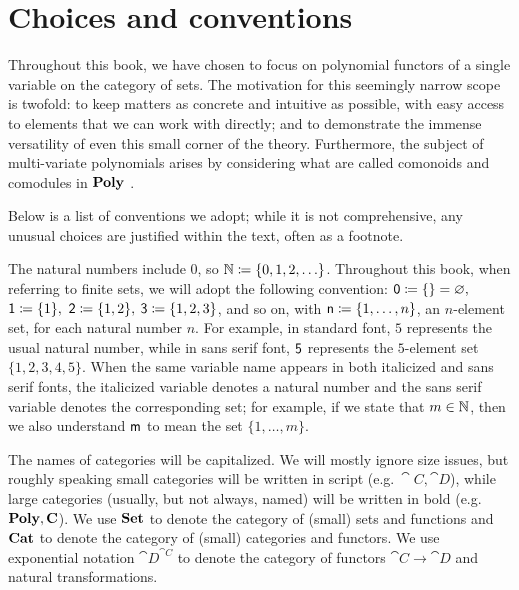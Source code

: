 \documentclass[Book-Poly]{subfiles}
\begin{document}
\section{Choices and conventions}\label{sec.choices}

Throughout this book, we have chosen to focus on polynomial functors of a single variable on the category of sets.
The motivation for this seemingly narrow scope is twofold: to keep matters as concrete and intuitive as possible, with easy access to elements that we can work with directly; and to demonstrate the immense versatility of even this small corner of the theory. Furthermore, the subject of multi-variate polynomials arises by considering what are called comonoids and comodules in $\mathbf{Poly}$ \cite{spivak2023functorial}.


Below is a list of conventions we adopt; while it is not comprehensive, any unusual choices are justified within the text, often as a footnote.

The natural numbers include $0$, so $\mathbb{N}\coloneqq\{0,1,2,\ldots\}$. Throughout this book, when referring to finite sets, we will adopt the following convention: $\textsf{0}\coloneqq\{\}=\varnothing,$ $\textsf{1}\coloneqq\{1\},$ $\textsf{2}\coloneqq\{1,2\},$ $\textsf{3}\coloneqq\{1,2,3\}$, and so on, with $\mathsf{n}\coloneqq\{1,\ldots,n\}$, an $n$-element set, for each natural number $n$.
For example, in standard font, $5$ represents the usual natural number, while in sans serif font, $\textsf{5}$ represents the $5$-element set $\{1,2,3,4,5\}$.
When the same variable name appears in both italicized and sans serif fonts, the italicized variable denotes a natural number and the sans serif variable denotes the corresponding set; for example, if we state that $m\in\mathbb{N}$, then we also understand $\mathsf{m}$ to mean the set $\{1,\ldots,m\}$.


The names of categories will be capitalized.
We will mostly ignore size issues, but roughly speaking small categories will be written in script (e.g.$\ \cat{C}, \cat{D}$), while large categories (usually, but not always, named) will be written in bold (e.g.\ $\mathbf{Poly}, \mathbf{C}$).
We use $\mathbf{Set}$ to denote the category of (small) sets and functions and $\mathbf{Cat}$ to denote the category of (small) categories and functors.
We use exponential notation $\cat{D}^{\cat{C}}$ to denote the category of functors $\cat{C}\to\cat{D}$ and natural transformations.
\end{document}
